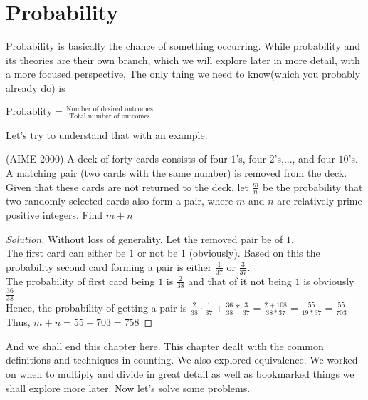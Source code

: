 \section{Probability}
Probability is basically the chance of something occurring. While probability and its theories are their own branch, which we will explore later in more detail, with a more focused perspective, The only thing we need to know(which you probably already do) is
\begin{theorem}
    $\text{Probablity} = \frac{\text{Number of desired outcomes}}{\text{Total number of outcomes}}$
\end{theorem}
Let's try to understand that with an example:
\begin{example}
    (AIME 2000) A deck of forty cards consists of four $1$’s, four $2$’s,..., and four $10$’s. A matching pair (two cards with the same number) is removed from the deck. Given that these cards are not returned to the deck, let $\frac{m}{n}$ be the probability that two randomly selected cards also form a pair, where $m$ and $n$ are relatively prime positive integers. Find $m + n$
\end{example}
\begin{proof}
    [Solution]
    Without loss of generality, Let the removed pair be of $1$.\\
    The first card can either be $1$ or not be $1$ (obviously). Based on this the probability second card forming a pair is either $\frac{1}{37}$ or $\frac{3}{37}$.\\
    The probability of first card being $1$ is $\frac{2}{38}$ and that of it not being $1$ is obviously $\frac{36}{38}$\\
    Hence, the probability of getting a pair is $\frac{2}{38}\cdot\frac{1}{37}+\frac{36}{38}*\frac{3}{37}=\frac{2+108}{38*37}=\frac{55}{19*37}=\frac{55}{703}$\\
    Thus, $m+n=55+703=758$
\end{proof}
And we shall end this chapter here. This chapter dealt with the common definitions and techniques in counting. We also explored equivalence. We worked on when to multiply and divide in great detail as well as bookmarked things we shall explore more later. Now let's solve some problems.

